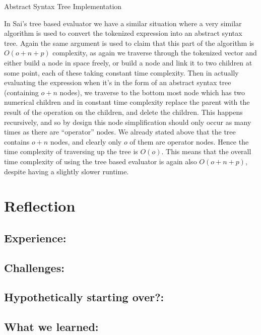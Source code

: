 \documentclass[11pt]{article}
\begin{document}
\centerline{Abstract Syntax Tree Implementation}
In Sai's tree based evaluator we have a similar situation where a very similar algorithm is used to convert the tokenized expression into an abstract syntax tree.
Again the same argument is used to claim that this part of the algorithm is $O(o+n+p)$ complexity, as again we traverse through the tokenized vector and either build a node in space freely, or build a node and link it to two children at some point, each of these taking constant time complexity.
Then in actually evaluating the expression when it's in the form of an abstract syntax tree (containing $o+n$ nodes), we traverse to the bottom most node which has two numerical children and in constant time complexity replace the parent with the result of the operation on the children, and delete the children.
This happens recursively, and so by design this node simplification should only occur as many times as there are ``operator'' nodes. We already stated above that the tree contains $o+n$ nodes, and clearly only $o$ of them are operator nodes. Hence the time complexity of traversing up the tree is $O(o)$. This means that the overall time complexity of using the tree based evaluator is again also $O(o+n+p)$, despite having a slightly slower runtime.

\noindent\makebox[\linewidth]{\rule{19.1cm}{0.4pt}}

\section*{Reflection}

\subsection*{Experience:}

\subsection*{Challenges:}

\subsection*{Hypothetically starting over?:}

\subsection*{What we learned:}

\noindent\makebox[\linewidth]{\rule{19.1cm}{0.4pt}}
\end{document}
